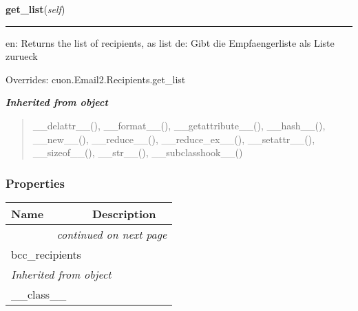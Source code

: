     \vspace{0.5ex}

\hspace{.8\funcindent}\begin{boxedminipage}{\funcwidth}

    \raggedright \textbf{get\_list}(\textit{self})

    \vspace{-1.5ex}

    \rule{\textwidth}{0.5\fboxrule}
\setlength{\parskip}{2ex}
    en: Returns the list of recipients, as list de: Gibt die 
    Empfaengerliste als Liste zurueck

\setlength{\parskip}{1ex}
      Overrides: cuon.Email2.Recipients.get\_list

    \end{boxedminipage}


\large{\textbf{\textit{Inherited from object}}}

\begin{quote}
\_\_delattr\_\_(), \_\_format\_\_(), \_\_getattribute\_\_(), \_\_hash\_\_(), \_\_new\_\_(), \_\_reduce\_\_(), \_\_reduce\_ex\_\_(), \_\_setattr\_\_(), \_\_sizeof\_\_(), \_\_str\_\_(), \_\_subclasshook\_\_()
\end{quote}


  \subsubsection{Properties}

    \vspace{-1cm}
\hspace{\varindent}\begin{longtable}{|p{\varnamewidth}|p{\vardescrwidth}|l}
\cline{1-2}
\cline{1-2} \centering \textbf{Name} & \centering \textbf{Description}& \\
\cline{1-2}
\endhead\cline{1-2}\multicolumn{3}{r}{\small\textit{continued on next page}}\\\endfoot\cline{1-2}
\endlastfoot\raggedright b\-c\-c\-\_\-r\-e\-c\-i\-p\-i\-e\-n\-t\-s\- & &\\
\cline{1-2}
\multicolumn{2}{|l|}{\textit{Inherited from object}}\\
\multicolumn{2}{|p{\varwidth}|}{\raggedright \_\_class\_\_}\\
\cline{1-2}
\end{longtable}


